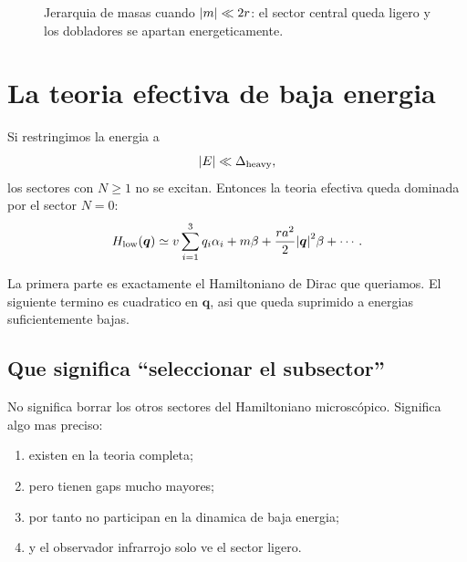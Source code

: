 \begin{figure}[h!]
\centering
{}
\caption{Jerarquia de masas cuando \(\abs{m}\ll 2r\): el sector central queda ligero y los dobladores se apartan energeticamente.}
\end{figure}

\section{La teoria efectiva de baja energia}
Si restringimos la energia a
\begin{equation}
\abs{E}\ll \Delta_{\text{heavy}},
\end{equation}
los sectores con \(N\ge 1\) no se excitan. Entonces la teoria efectiva queda dominada por el sector \(N=0\):
\begin{equation}
H_{\text{low}}(\bm{q})
\simeq
v\sum_{i=1}^3 q_i \alpha_i + m\beta
+
\frac{ra^2}{2}\abs{\bm{q}}^2\beta + \cdots.
\label{c14:eq:lowenergy}
\end{equation}

La primera parte es exactamente el Hamiltoniano de Dirac que queriamos. El siguiente termino es cuadratico en \(\bm{q}\), asi que queda suprimido a energias suficientemente bajas.

\subsection{Que significa \enquote{seleccionar el subsector}}
No significa borrar los otros sectores del Hamiltoniano microscópico. Significa algo mas preciso:
\begin{enumerate}[label=\arabic*.]
    \item existen en la teoria completa;
    \item pero tienen gaps mucho mayores;
    \item por tanto no participan en la dinamica de baja energia;
    \item y el observador infrarrojo solo ve el sector ligero.
\end{enumerate}

